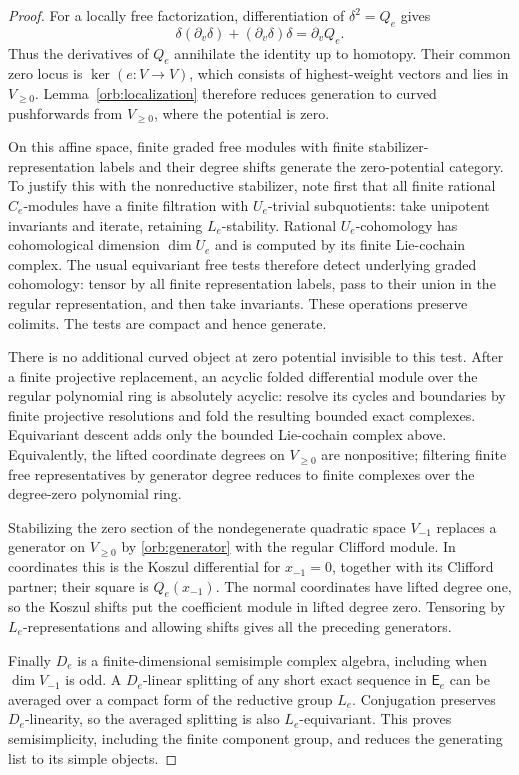 \begin{proof}
For a locally free factorization, differentiation of $\delta^2=Q_e$
gives
\[
 \delta(\partial_v\delta)+(\partial_v\delta)\delta
                         =\partial_vQ_e.
\]
Thus the derivatives of $Q_e$ annihilate the identity up to homotopy.
Their common zero locus is $\ker(e:V\to V)$, which consists of
highest-weight vectors and lies in $V_{\ge0}$.  Lemma~\ref{orb:localization}
therefore reduces generation to curved pushforwards from $V_{\ge0}$,
where the potential is zero.

On this affine space, finite graded free modules with finite
stabilizer-representation labels and their degree shifts generate the
zero-potential category.  To justify this with the nonreductive
stabilizer, note first that all finite rational $C_e$-modules have a
finite filtration with $U_e$-trivial subquotients: take unipotent
invariants and iterate, retaining $L_e$-stability.  Rational
$U_e$-cohomology has cohomological dimension $\dim U_e$ and is computed
by its finite Lie-cochain complex.  The usual equivariant free tests
therefore detect underlying graded cohomology: tensor by all finite
representation labels, pass to their union in the regular
representation, and then take invariants.  These operations preserve
colimits.  The tests are compact and hence generate.

There is no additional curved object at zero potential invisible to
this test.  After a finite projective replacement, an acyclic folded
differential module over the regular polynomial ring is absolutely
acyclic: resolve its cycles and boundaries by finite projective
resolutions and fold the resulting bounded exact complexes.
Equivariant descent adds only the bounded Lie-cochain complex above.
Equivalently, the lifted coordinate degrees on $V_{\ge0}$ are
nonpositive; filtering finite free representatives by generator degree
reduces to finite complexes over the degree-zero polynomial ring.

Stabilizing the zero section of the nondegenerate quadratic space
$V_{-1}$ replaces a generator on $V_{\ge0}$ by
\eqref{orb:generator} with the regular Clifford module.  In coordinates
this is the Koszul differential for $x_{-1}=0$, together with its
Clifford partner; their square is $Q_e(x_{-1})$.  The normal coordinates
have lifted degree one, so the Koszul shifts put the coefficient
module in lifted degree zero.  Tensoring by $L_e$-representations and
allowing shifts gives all the preceding generators.

Finally $D_e$ is a finite-dimensional semisimple complex algebra,
including when $\dim V_{-1}$ is odd.  A $D_e$-linear splitting of any
short exact sequence in $\mathsf E_e$ can be averaged over a compact
form of the reductive group $L_e$.  Conjugation preserves $D_e$-linearity,
so the averaged splitting is also $L_e$-equivariant.  This proves
semisimplicity, including the finite component group, and reduces the
generating list to its simple objects.
\end{proof}

